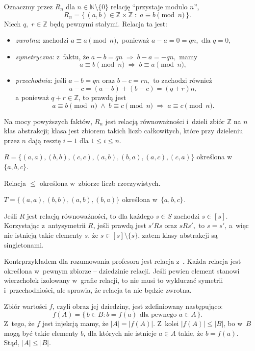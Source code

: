 \exercise %
Oznaczmy przez $R_n$ dla $n\in\mathbb{N}\setminus\{0\}$ relację ``przystaje modulo $n$'',
\[
	R_n = \bigl\{\,(a,b)\in\mathbb{Z}\times\mathbb{Z}\;:\;a\equiv b\!\!\!\pmod{n}\,\bigr\}.
\]
Niech $q$,~$r\in\mathbb{Z}$ będą pewnymi stałymi. Relacja ta jest:
\begin{itemize}
	\item \emph{zwrotna}: zachodzi $a\equiv a\pmod{n},$ ponieważ $a-a=0=qn,$ dla $q=0$,
	\item \emph{symetryczna}: z~faktu, że $a-b=qn\;\Rightarrow\;b-a=-qn,$ mamy
	\[
		a\equiv b\!\!\!\pmod{n}\;\Rightarrow\;b\equiv a\!\!\!\pmod{n},
	\]
	\item \emph{przechodnia}: jeśli $a-b=qn$ oraz $b-c=rn,$ to zachodzi również
	\[
		a-c=(a-b)+(b-c)=(q+r)n,
	\]
	a ponieważ $q+r\in\mathbb{Z}$, to prawdą jest
	\[
		a\equiv b\!\!\!\pmod{n}\;\wedge\;b\equiv c\!\!\!\pmod{n}\;\Rightarrow\;a\equiv c\!\!\!\pmod{n}.
	\]
\end{itemize}

Na mocy powyższych faktów, $R_n$ jest relacją równoważności i~dzieli zbiór $\mathbb{Z}$ na $n$ klas abstrakcji;  klasa jest zbiorem takich liczb całkowitych, które przy dzieleniu przez $n$ dają resztę $i-1$ dla $1\le i\le n$.

\exercise %
\subexercise
$R=\bigl\{(a,a),(b,b),(c,c),(a,b),(b,a),(a,c),(c,a)\bigr\}$ określona w~$\{a,b,c\}$.

\subexercise
Relacja $\le$ określona w~zbiorze liczb rzeczywistych.

\subexercise
$T=\bigl\{(a,a),(b,b),(a,b),(b,a)\bigr\}$ określona w~$\{a,b,c\}$.

\exercise %
Jeśli $R$ jest relacją równoważności, to dla każdego $s\in S$ zachodzi $s\in[s]$. Korzystając z~antysymetrii $R$, jeśli prawdą jest $s'\!Rs$ oraz $sRs',$ to $s=s'$, a~więc nie istnieją takie elementy $s$, że $s\in[s]\setminus\{s\}$, zatem klasy abstrakcji są singletonami.

\exercise %
Kontrprzykładem dla rozumowania profesora jest relacja z~. Każda relacja jest określona w~pewnym zbiorze -- dziedzinie relacji. Jeśli pewien element stanowi wierzchołek izolowany w~grafie relacji, to nie musi to wykluczać symetrii i~przechodniości, ale sprawia, że relacja ta nie będzie zwrotna.


\exercise %
\subexercise
Zbiór wartości $f$, czyli obraz jej dziedziny, jest zdefiniowany następująco:
\[
	f(A) = \bigl\{\,b\in B:b=f(a)\text{ dla pewnego $a\in A$}\,\bigr\}.
\]
Z~tego, że $f$ jest injekcją mamy, że $|A|=|f(A)|$. Z~kolei $|f(A)|\le|B|$, bo w~$B$ mogą być takie elementy $b$, dla których nie istnieje $a\in A$ takie, że $b=f(a)$. Stąd, $|A|\le|B|$.

